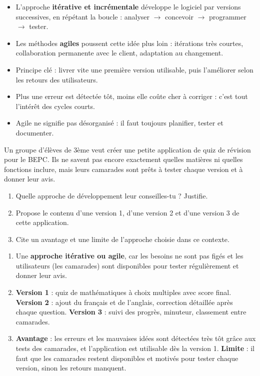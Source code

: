 \documentclass[11pt]{article}
\begin{document}
\begin{aretenir}[L'essentiel]
\begin{itemize}
\item L'approche \textbf{itérative et incrémentale} développe le logiciel par versions successives, en répétant la boucle : analyser $\rightarrow$ concevoir $\rightarrow$ programmer $\rightarrow$ tester.
\item Les méthodes \textbf{agiles} poussent cette idée plus loin : itérations très courtes, collaboration permanente avec le client, adaptation au changement.
\item Principe clé : livrer vite une première version utilisable, puis l'améliorer selon les retours des utilisateurs.
\item Plus une erreur est détectée tôt, moins elle coûte cher à corriger : c'est tout l'intérêt des cycles courts.
\item Agile ne signifie pas désorganisé : il faut toujours planifier, tester et documenter.
\end{itemize}
\end{aretenir}

\begin{exercice}
Un groupe d'élèves de 3ème veut créer une petite application de quiz de révision pour le BEPC. Ils ne savent pas encore exactement quelles matières ni quelles fonctions inclure, mais leurs camarades sont prêts à tester chaque version et à donner leur avis.
\begin{enumerate}
\item Quelle approche de développement leur conseilles-tu ? Justifie.
\item Propose le contenu d'une version 1, d'une version 2 et d'une version 3 de cette application.
\item Cite un avantage et une limite de l'approche choisie dans ce contexte.
\end{enumerate}
\end{exercice}

\begin{corrige}[Exercice]
\begin{enumerate}
\item Une \textbf{approche itérative ou agile}, car les besoins ne sont pas figés et les utilisateurs (les camarades) sont disponibles pour tester régulièrement et donner leur avis.
\item \textbf{Version 1} : quiz de mathématiques à choix multiples avec score final. \textbf{Version 2} : ajout du français et de l'anglais, correction détaillée après chaque question. \textbf{Version 3} : suivi des progrès, minuteur, classement entre camarades.
\item \textbf{Avantage} : les erreurs et les mauvaises idées sont détectées très tôt grâce aux tests des camarades, et l'application est utilisable dès la version 1. \textbf{Limite} : il faut que les camarades restent disponibles et motivés pour tester chaque version, sinon les retours manquent.
\end{enumerate}
\end{corrige}
\end{document}
